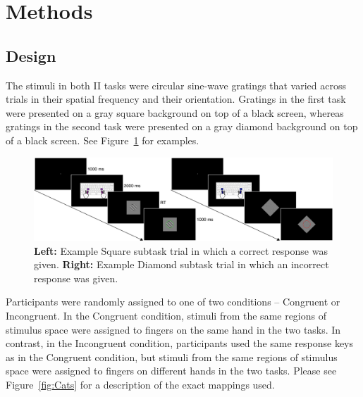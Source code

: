 \documentclass[doc, floatsintext]{apa7}
\begin{document}
\section{Methods}

\subsection{Design}
The stimuli in both II tasks were circular sine-wave gratings that varied across trials in their spatial frequency and their orientation. Gratings in the first
task were presented on a gray square background on top of a black screen, whereas gratings in the second task were
presented on a gray diamond background on top of a black screen. See Figure~\ref{fig_example_trials.png} for
examples.

\begin{figure}[h!]
    \centering
    \includegraphics[width=\textwidth]{../figures/fig_example_trials.png}
    \caption{
    \textbf{Left:} Example Square subtask trial in which a
    correct response was given.  \textbf{Right:} Example
    Diamond subtask trial in which an incorrect response was
    given.
}
    \label{fig_example_trials.png}
\end{figure}

Participants were randomly assigned to one of two conditions -- Congruent or Incongruent. In the Congruent condition, stimuli from the same regions of stimulus space were assigned to fingers on the same hand in the two tasks. In contrast, in the Incongruent condition, participants used the same response keys as in the Congruent condition, but stimuli from the same regions of stimulus space were assigned to fingers on different hands in the two tasks. Please see Figure~\ref{fig:Cats} for a description of the exact mappings used.
\end{document}
